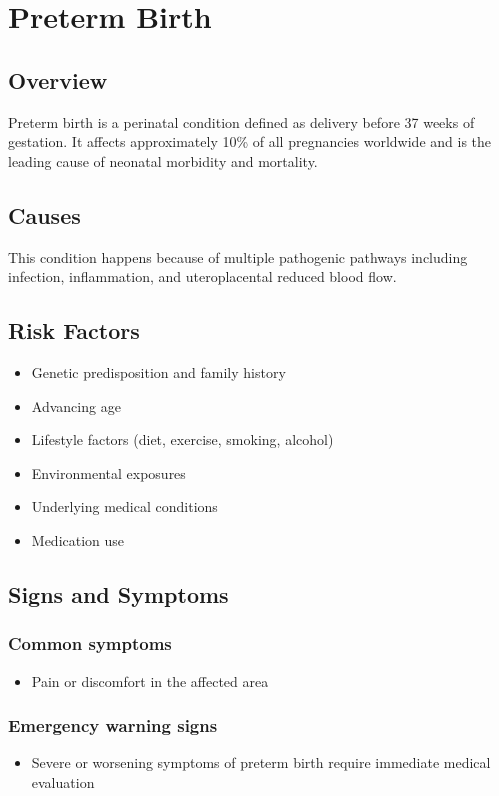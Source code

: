 \chapter{Preterm Birth}
\label{sec:Preterm Birth}

\section{Overview}
Preterm birth is a perinatal condition defined as delivery before 37 weeks of gestation. It affects approximately 10\% of all pregnancies worldwide and is the leading cause of neonatal morbidity and mortality.
\section{Causes}
This condition happens because of multiple pathogenic pathways including infection, inflammation, and uteroplacental reduced blood flow.     
\section{Risk Factors}

\begin{itemize}[noitemsep]
  \item Genetic predisposition and family history
  \item Advancing age
  \item Lifestyle factors (diet, exercise, smoking, alcohol)
  \item Environmental exposures
  \item Underlying medical conditions
  \item Medication use
\end{itemize}
\section{Signs and Symptoms}

\subsection{Common symptoms}
\begin{itemize}[noitemsep]
  \item Pain or discomfort in the affected area
  \end{itemize}

\subsection{Emergency warning signs}
\begin{itemize}[noitemsep]
  \item Severe or worsening symptoms of preterm birth require immediate medical evaluation
\end{itemize}
